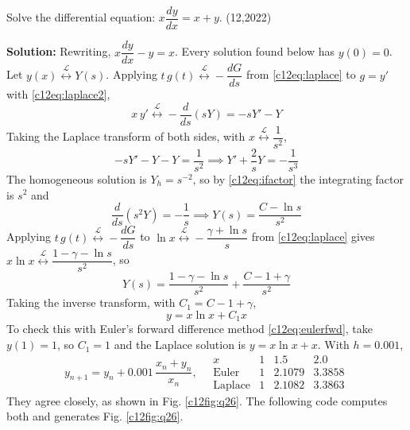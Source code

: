 \nopagebreak[4]
\begin{center}
\end{center}


\clearpage
\item Solve the differential equation: $x\dfrac{dy}{dx} = x + y$. \hfill (12,2022)

\textbf{Solution:} Rewriting, $x\dfrac{dy}{dx} - y = x$. Every solution found below has $y(0) = 0$. Let $y(x) \overset{\mathcal{L}}{\longleftrightarrow} Y(s)$. Applying $t\,g(t) \overset{\mathcal{L}}{\longleftrightarrow} -\dfrac{dG}{ds}$ from \eqref{c12eq:laplace} to $g = y'$ with \eqref{c12eq:laplace2},
\begin{equation}
x\,y' \overset{\mathcal{L}}{\longleftrightarrow} -\frac{d}{ds}\left(sY\right) = -sY' - Y
\end{equation}
Taking the Laplace transform of both sides, with $x \overset{\mathcal{L}}{\longleftrightarrow} \dfrac{1}{s^2}$,
\begin{equation}
-sY' - Y - Y = \frac{1}{s^2} \implies Y' + \frac{2}{s}Y = -\frac{1}{s^3}
\end{equation}
The homogeneous solution is $Y_h = s^{-2}$, so by \eqref{c12eq:ifactor} the integrating factor is $s^2$ and
\begin{equation}
\frac{d}{ds}\left(s^2 Y\right) = -\frac{1}{s} \implies Y(s) = \frac{C - \ln s}{s^2}
\end{equation}
Applying $t\,g(t) \overset{\mathcal{L}}{\longleftrightarrow} -\dfrac{dG}{ds}$ to $\ln x \overset{\mathcal{L}}{\longleftrightarrow} -\dfrac{\gamma+\ln s}{s}$ from \eqref{c12eq:laplace} gives $x\ln x \overset{\mathcal{L}}{\longleftrightarrow} \dfrac{1-\gamma-\ln s}{s^2}$, so
\begin{equation}
Y(s) = \frac{1-\gamma-\ln s}{s^2} + \frac{C-1+\gamma}{s^2}
\end{equation}
Taking the inverse transform, with $C_1 = C - 1 + \gamma$,
\begin{equation}
y = x\ln x + C_1 x
\end{equation}
To check this with Euler's forward difference method \eqref{c12eq:eulerfwd}, take $y(1) = 1$, so $C_1 = 1$ and the Laplace solution is $y = x\ln x + x$. With $h = 0.001$,
\begin{equation}
y_{n+1} = y_n + 0.001\,\frac{x_n + y_n}{x_n}, \quad
\begin{array}{c|ccc}
x & 1 & 1.5 & 2.0 \\ \hline
\text{Euler} & 1 & 2.1079 & 3.3858 \\
\text{Laplace} & 1 & 2.1082 & 3.3863
\end{array}
\end{equation}
They agree closely, as shown in Fig. \ref{c12fig:q26}. The following code computes both and generates Fig. \ref{c12fig:q26}.


